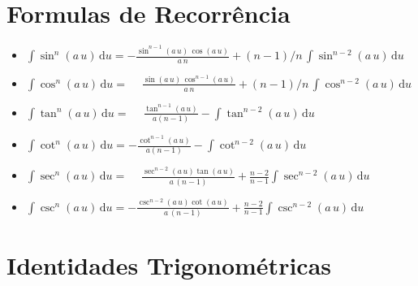 \part*{Formulas de Recorrência}
\label{Formulas de Recorrência}

\begin{sectionBox}{}
\begin{itemize}\large
    \item \(
        \int \sin^n(a\,u)\,\mathrm{d}u
    =    - \frac
            { \sin^{n-1}(a\,u)\,\cos(a\,u)}
            {a\,n}
    +    (n-1)/n\,\int \sin^{n-2}(a\,u)\,\mathrm{d}u
    \)
    \item \(
        \int \cos^n(a\,u)\,\mathrm{d}u
    =    \phantom{-} \frac
            { \sin(a\,u)\,\cos^{n-1}(a\,u)}
            {a\,n}
    +    (n-1)/n\,\int \cos^{n-2}(a\,u)\,\mathrm{d}u
    \)
    \item \(
        \int \tan^n(a\,u)\,\mathrm{d}u
    =    \phantom{-} \frac
            { \tan^{n-1}(a\,u) }
            {a(n-1)}
    -    \int \tan^{n-2}(a\,u)\,\mathrm{d}u
    \)
    \item \(
        \int \cot^n(a\,u)\,\mathrm{d}u
    =    - \frac
            {\cot^{n-1}(a\,u)}
            {a(n-1)}
    -    \int \cot^{n-2}(a\,u)\,\mathrm{d}u
    \)
    \item \(
        \int \sec^n(a\,u)\,\mathrm{d}u
    =    \phantom{-} \frac
            {\sec^{n-2}(a\,u) \tan(a\,u)}
            {a\,(n-1)}
    +    \frac{n-2}{n-1} \int \sec^{n-2} (a\,u)\,\mathrm{d}u
    \)
    \item \(
        \int \csc^n(a\,u)\,\mathrm{d}u
    =    - \frac
            {\csc^{n-2}(a\,u) \cot(a\,u)}
            {a\,(n-1)}
    +    \frac{n-2}{n-1} \int \csc^{n-2}(a\,u)\,\mathrm{d}u
    \)
\end{itemize}
\end{sectionBox}

\part*{Identidades Trigonométricas}
\label{Identidades Trigonométricas}

